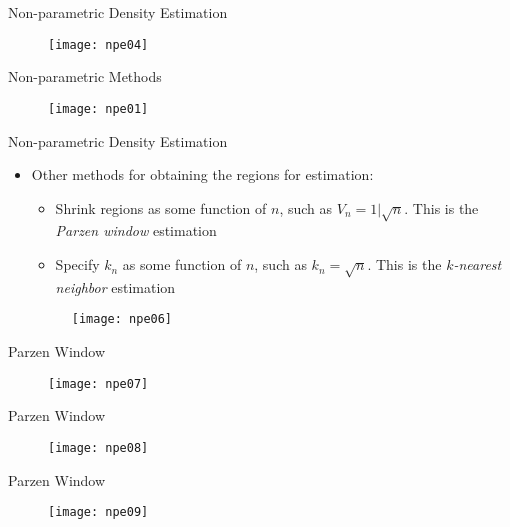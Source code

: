 \begin{frame}{Non-parametric Density Estimation}
\begin{figure}
\texttt{[image: npe04]}
\end{figure}
\end{frame}

\begin{frame}{Non-parametric Methods}
\begin{figure}
\texttt{[image: npe01]}
\end{figure}
\end{frame}



\begin{frame}{Non-parametric Density Estimation}
\vspace{-0.5cm}
\begin{itemize}
\item Other methods for obtaining the regions for estimation:
\begin{itemize}
\item Shrink regions as some function of $n$, such as $V_n=1|\sqrt{n}$.
This is the \textit{\color{mycolor1} Parzen window} estimation
\item Specify $k_n$ as some function of $n$, such as $k_n=\sqrt{n}$. This is the \textit{\color{mycolor1}$k$-nearest neighbor} estimation
\end{itemize}
\begin{figure}
\texttt{[image: npe06]}
\end{figure}
\end{itemize}
\end{frame}

\begin{frame}{Parzen Window}
\begin{figure}
\texttt{[image: npe07]}
\end{figure}
\end{frame}

\begin{frame}{Parzen Window}
\vspace{-0.5cm}
\begin{figure}
\texttt{[image: npe08]}
\end{figure}
\end{frame}

\begin{frame}{Parzen Window}
\vspace{-0.5cm}
\begin{figure}
\texttt{[image: npe09]}
\end{figure}
\end{frame}

